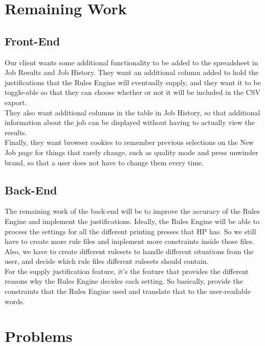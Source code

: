 \documentclass[onecolumn, draftclsnofoot,10pt, compsoc]{IEEEtran}
\begin{document}
\vspace*{\floatsep}
\section{Remaining Work}
\subsection{Front-End}
Our client wants some additional functionality to be added to the spreadsheet in Job Results and Job History. They want an additional column added to hold the justifications that the Rules Engine will eventually supply, and they want it to be toggle-able so that they can choose whether or not it will be included in the CSV export.\\[10pt]
They also want additional columns in the table in Job History, so that additional information about the job can be displayed without having to actually view the results.\\[10pt]
Finally, they want browser cookies to remember previous selections on the New Job page for things that rarely change, such as quality mode and press unwinder brand, so that a user does not have to change them every time.

\subsection{Back-End} 
The remaining work of the back-end will be to improve the accuracy of the Rules Engine and implement the justifications. Ideally, the Rules Engine will be able to process the settings for all the different printing presses that HP has. So we still have to create more rule files and implement more constraints inside those files. Also, we have to create different rulesets to handle different situations from the user, and decide which rule files different rulesets should contain.\\[10pt]
For the supply justification feature, it's the feature that provides the different reasons why the Rules Engine decides each setting. So basically, provide the constraints that the Rules Engine used and translate that to the user-readable words.

\vspace*{\floatsep}
\section{Problems}
\end{document}
